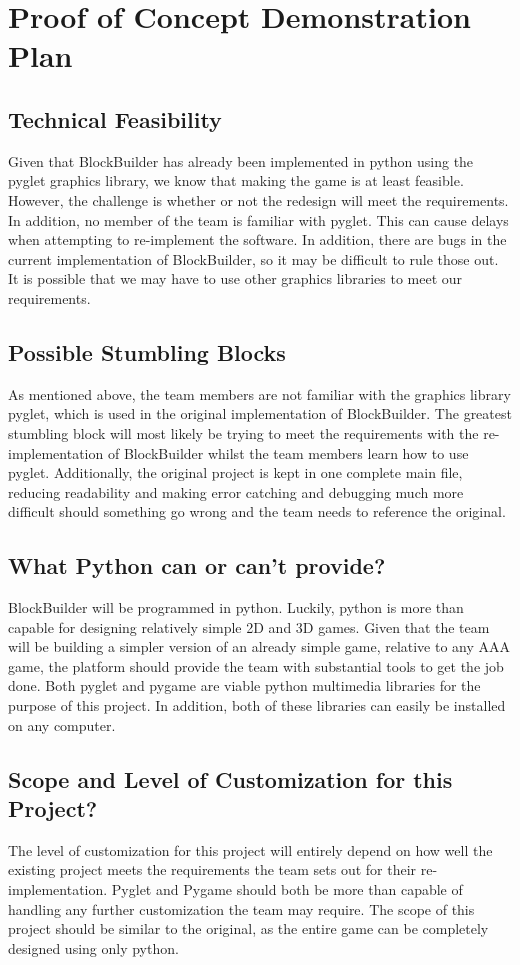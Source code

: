 \documentclass{article}
\begin{document}
\newpage
\section{Proof of Concept Demonstration Plan}
\subsection{Technical Feasibility}
    Given that BlockBuilder has already been implemented in python using the pyglet graphics library, we know that making the game is at least feasible. However, the challenge is whether or not the redesign will meet the requirements. In addition, no member of the team is familiar with pyglet. This can cause delays when attempting to re-implement the software. In addition, there are bugs in the current implementation of BlockBuilder, so it may be difficult to rule those out. It is possible that we may have to use other graphics libraries to meet our requirements.
\subsection{Possible Stumbling Blocks}
    As mentioned above, the team members are not familiar with the graphics library pyglet, which is used in the original implementation of BlockBuilder. The greatest stumbling block will most likely be trying to meet the requirements with the re-implementation of BlockBuilder whilst the team members learn how to use pyglet.
    Additionally, the original project is kept in one complete main file, reducing readability and making error catching and debugging much more difficult should something go wrong and the team needs to reference the original.
\subsection{What Python can or can't provide?}
    BlockBuilder will be programmed in python. Luckily, python is more than capable for designing relatively simple 2D and 3D games. Given that the team will be building a simpler version of an already simple game, relative to any AAA game, the platform should provide the team with substantial tools to get the job done. Both pyglet and pygame are viable python multimedia libraries for the purpose of this project. In addition, both of these libraries can easily be installed on any computer.
\subsection{Scope and Level of Customization for this Project?}
    The level of customization for this project will entirely depend on how well the existing project meets the requirements the team sets out for their re-implementation. Pyglet and Pygame should both be more than capable of handling any further customization the team may require. The scope of this project should be similar to the original, as the entire game can be completely designed using only python.
\newpage
\end{document}

